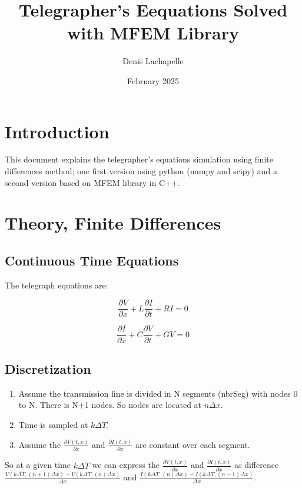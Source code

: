 \documentclass[12pt, letterpaper]{article}
\title{Telegrapher's Eequations Solved with MFEM Library}
\author{Denis Lachapelle}
\date{February 2025}
\begin{document}
\maketitle

\section{Introduction}
This document explains the telegrapher's equations simulation using finite differences method; one first version using python (numpy and scipy) and a second version based on MFEM library in C++.


\section{Theory, Finite Differences}
\subsection{Continuous Time Equations}

The telegraph equations are:

\begin{equation}\frac{\partial{V}}{\partial{x}} + L \frac{\partial{I}}{\partial{t}} + R I = 0\end{equation}


\begin{equation}\frac{\partial{I}}{\partial{x}} + C \frac{\partial{V}}{\partial{t}} + G V = 0\end{equation}

\subsection{Discretization}

\begin{enumerate}
\item Assume the transmission line is divided in N segments (nbrSeg) with nodes 0 to N. There is N+1 nodes. So nodes are located at $n \Delta x$.
\item Time is sampled at $k \Delta T$.
\item Assume the $\frac{\partial V(t, x)}{\partial x}$ and $\frac{\partial I(t, x)}{\partial x}$ are constant over each segment.
\end{enumerate}

So at a given time $k \Delta T$ we can express the $\frac{\partial V(t, x)}{\partial x}$ and $\frac{\partial I(t, x)}{\partial x}$ as difference  $\frac{V(k \Delta T, (n+1) \Delta x) - V(k \Delta T, (n) \Delta x)}{\Delta x}$ and  $\frac{I(k \Delta T, (n) \Delta x) - I(k \Delta T, (n-1) \Delta x)}{\Delta x}$.\\
\end{document}
